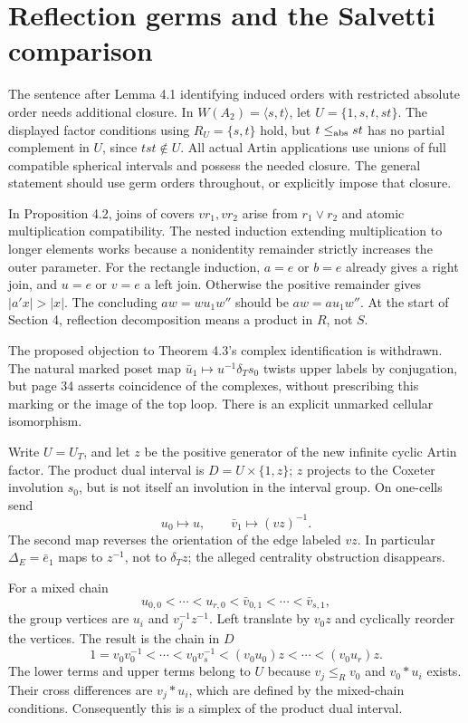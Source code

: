 \documentclass[10pt]{article}
\begin{document}
\section*{Reflection germs and the Salvetti comparison}
The sentence after Lemma 4.1 identifying induced orders with restricted absolute order needs additional closure. In \(W(A_2)=\langle s,t\rangle\), let \(U=\{1,s,t,st\}\). The displayed factor conditions using \(R_U=\{s,t\}\) hold, but \(t\le_{\rm abs}st\) has no partial complement in \(U\), since \(tst\notin U\). All actual Artin applications use unions of full compatible spherical intervals and possess the needed closure. The general statement should use germ orders throughout, or explicitly impose that closure.\par
In Proposition 4.2, joins of covers \(vr_1,vr_2\) arise from \(r_1\vee r_2\) and atomic multiplication compatibility. The nested induction extending multiplication to longer elements works because a nonidentity remainder strictly increases the outer parameter. For the rectangle induction, \(a=e\) or \(b=e\) already gives a right join, and \(u=e\) or \(v=e\) a left join. Otherwise the positive remainder gives \(|a'x|>|x|\). The concluding \(aw=wu_1w''\) should be \(aw=au_1w''\). At the start of Section 4, reflection decomposition means a product in \(R\), not \(S\).\par
The proposed objection to Theorem 4.3’s complex identification is withdrawn. The natural marked poset map \(\bar u_1\mapsto u^{-1}\delta_Ts_0\) twists upper labels by conjugation, but page 34 asserts coincidence of the complexes, without prescribing this marking or the image of the top loop. There is an explicit unmarked cellular isomorphism.\par
Write \(U=U_T\), and let \(z\) be the positive generator of the new infinite cyclic Artin factor. The product dual interval is \(D=U\times\{1,z\}\); \(z\) projects to the Coxeter involution \(s_0\), but is not itself an involution in the interval group. On one-cells send \[u_0\longmapsto u,\qquad
 \bar v_1\longmapsto(vz)^{-1}.\] The second map reverses the orientation of the edge labeled \(vz\). In particular \(\Delta_E=\bar e_1\) maps to \(z^{-1}\), not to \(\delta_Tz\); the alleged centrality obstruction disappears.\par
For a mixed chain \[u_{0,0}<\cdots<u_{r,0}<\bar v_{0,1}<\cdots<\bar v_{s,1},\] the group vertices are \(u_i\) and \(v_j^{-1}z^{-1}\). Left translate by \(v_0z\) and cyclically reorder the vertices. The result is the chain in \(D\) \[1=v_0v_0^{-1}<\cdots<v_0v_s^{-1}
       <(v_0u_0)z<\cdots<(v_0u_r)z .\] The lower terms and upper terms belong to \(U\) because \(v_j\le_Rv_0\) and \(v_0*u_i\) exists. Their cross differences are \(v_j*u_i\), which are defined by the mixed-chain conditions. Consequently this is a simplex of the product dual interval.\par
\end{document}
